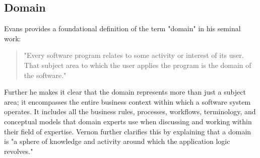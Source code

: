\subsection{Domain}
Evans provides a foundational definition of the term "domain" in his seminal work:
\begin{quote}
"Every software program relates to some activity or interest of its user. That subject area to which the user applies the program is the domain of the software."
\autocite[p.~4]{evans2004domain}
\end{quote}
Further he makes it clear that the domain represents more than just a subject area; it encompasses the entire business context within which a software system operates. It includes all the business rules, processes, workflows, terminology, and conceptual models that domain experts use when discussing and working within their field of expertise. Vernon \autocite[p.~17]{vernon2013implementing} further clarifies this by explaining that a domain is "a sphere of knowledge and activity around which the application logic revolves." 
